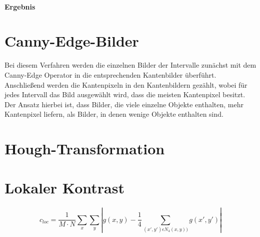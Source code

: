 \paragraph{Ergebnis}


\section{Canny-Edge-Bilder}
Bei diesem Verfahren werden die einzelnen Bilder der Intervalle zunächst mit dem Canny-Edge Operator in die entsprechenden Kantenbilder überführt. Anschließend werden die Kantenpixeln in den Kantenbildern gezählt, wobei für jedes Intervall das Bild ausgewählt wird, dass die meisten Kantenpixel besitzt.\\

Der Ansatz hierbei ist, dass Bilder, die viele einzelne Objekte enthalten, mehr Kantenpixel liefern, als Bilder, in denen wenige Objekte enthalten sind.

\section{Hough-Transformation}

\section{Lokaler Kontrast}
\begin{equation*}
c_{loc} = \frac{1}{M \cdot N}\sum_{x}^{{}} \sum_{y}^{{}} \left | g(x, y) - \frac{1}{4} \sum_{(x', y') \epsilon N_4(x, y))}^{{}} g(x', y') \right |
\end{equation*}
	


